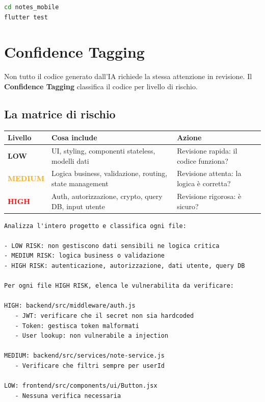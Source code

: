 \begin{lstlisting}[language=bash]
cd notes_mobile
flutter test
\end{lstlisting}

\section{Confidence Tagging}

Non tutto il codice generato dall'IA richiede la stessa attenzione in revisione. Il \textbf{Confidence Tagging} classifica il codice per livello di rischio.

\subsection{La matrice di rischio}

\begin{center}
\begin{tabularx}{\textwidth}{l l X}
\toprule
\textbf{Livello} & \textbf{Cosa include} & \textbf{Azione} \\
\midrule
\textcolor{green!60!black}{\textbf{LOW}} & UI, styling, componenti stateless, modelli dati & Revisione rapida: il codice funziona? \\
\textcolor{orange}{\textbf{MEDIUM}} & Logica business, validazione, routing, state management & Revisione attenta: la logica è corretta? \\
\textcolor{red}{\textbf{HIGH}} & Auth, autorizzazione, crypto, query DB, input utente & Revisione rigorosa: è sicuro? \\
\bottomrule
\end{tabularx}
\end{center}

\begin{praticabox}[title={Pratica --- Analisi di rischio del progetto}]
\begin{lstlisting}[language={}]
Analizza l'intero progetto e classifica ogni file:

- LOW RISK: non gestiscono dati sensibili ne logica critica
- MEDIUM RISK: logica business o validazione
- HIGH RISK: autenticazione, autorizzazione, dati utente, query DB

Per ogni file HIGH RISK, elenca le vulnerabilita da verificare:

HIGH: backend/src/middleware/auth.js
   - JWT: verificare che il secret non sia hardcoded
   - Token: gestisca token malformati
   - User lookup: non vulnerabile a injection

MEDIUM: backend/src/services/note-service.js
   - Verificare che filtri sempre per userId

LOW: frontend/src/components/ui/Button.jsx
   - Nessuna verifica necessaria
\end{lstlisting}
\end{praticabox}

